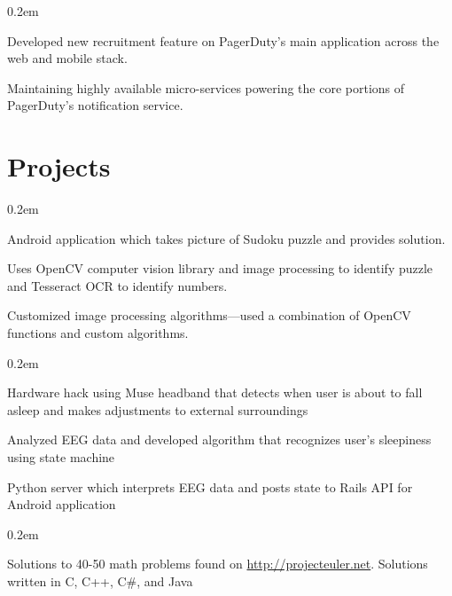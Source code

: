 \documentclass[]{deedy-resume}
\begin{document}
\begin{minipage}[t]{0.74\textwidth}
\begin{tightemize}\itemsep0.2em
\item Developed new recruitment feature on PagerDuty's main application across the web and mobile stack.
\item Maintaining highly available micro-services powering the core portions of PagerDuty's notification service.
\end{tightemize}

\sectionsep


\section{Projects}
\begin{tightemize}\itemsep0.2em
\item Android application which takes picture of Sudoku puzzle and provides solution.
\item Uses OpenCV computer vision library and image processing to identify puzzle and Tesseract OCR to
identify numbers.
\item Customized image processing algorithms—used a combination of OpenCV functions and custom
  algorithms.
\end{tightemize}
\sectionsep

\begin{tightemize}\itemsep0.2em
\item Hardware hack using Muse headband that detects when user is about to fall asleep and makes adjustments to external surroundings
\item Analyzed EEG data and developed algorithm that recognizes user's sleepiness using state machine
\item Python server which interprets EEG data and posts state to Rails API for Android application
\end{tightemize}
\sectionsep

\begin{tightemize}\itemsep0.2em
  \item Solutions to 40-50 math problems found on \href{http://projecteuler.net}{http://projecteuler.net}. Solutions written in C, C++, C\#, and
Java
\end{tightemize}
\sectionsep

\end{minipage}
\end{document}

